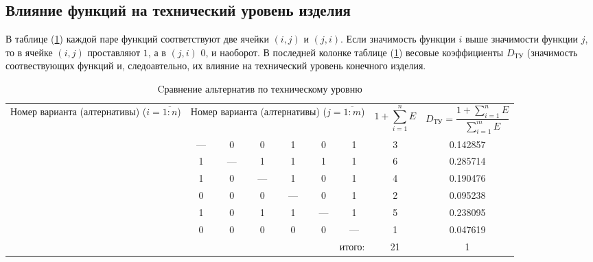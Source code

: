 \subsection{Влияние функций на технический уровень изделия}
В таблице (\ref{tbl_technical_lvl_comparison}) каждой паре функций
соответствуют две ячейки $(i, j)$ и $(j, i)$.
Если значимость функции $i$ выше значимости функции
$j$, то в ячейке $(i, j)$ проставляют $1$, а в $(j, i)$ $0$, и наоборот.
В последней колонке таблице (\ref{tbl_technical_lvl_comparison}) весовые
коэффициенты $D_{\text{ТУ}}$ (значимость соотвествующих функций и, следоавтельно,
их влияние на технический уровень конечного изделия.
\begin{table}[h!]
    \centering
    \begin{tabular}{|c|c|c|c|c|c|c|c|c|}
        \hline
        \multirow{2}{2.4cm}{
            \centering
            Номер варианта (алтернативы) ($i = \overline{1:n}$)
        } &
        \multicolumn{6}{c|}{
            \parbox[t]{2.4cm}{
                \centering
                Номер варианта (алтернативы) ($j = \overline{1:m}$)
            }
        } &
        \multirow{2}{1.7cm}[0pt]{
            \centering
            $$1 + \sum_{i=1}^n E$$
        } &
        \multirow{2}{3.2cm}{
            \centering
            $$ D_\text{ТУ} = \frac{1 + \sum_{i=1}^n E}{\sum_{i=1}^m E}$$
        } \\
        &
        \centering{1} &
        \centering{2} &
        \centering{3} &
        \centering{4} &
        \centering{5} &
        \centering{6} & & \\
        \hline \hline
        \centering{1} &---& 0 & 0 & 1 & 0 & 1 & 3 & 0.142857 \\ \hline
        \centering{2} & 1 &---& 1 & 1 & 1 & 1 & 6 & 0.285714 \\ \hline
        \centering{3} & 1 & 0 &---& 1 & 0 & 1 & 4 & 0.190476 \\ \hline
        \centering{4} & 0 & 0 & 0 &---& 0 & 1 & 2 & 0.095238 \\ \hline
        \centering{5} & 1 & 0 & 1 & 1 &---& 1 & 5 & 0.238095 \\ \hline
        \centering{6} & 0 & 0 & 0 & 0 & 0 &---& 1 & 0.047619 \\ \hline
        \hline
        \multicolumn{7}{|r|}{итого:} & 21 & 1 \\
        \hline
    \end{tabular}
    \caption{Cравнение альтернатив по техническому уровню}
    \label{tbl_technical_lvl_comparison}
\end{table}


